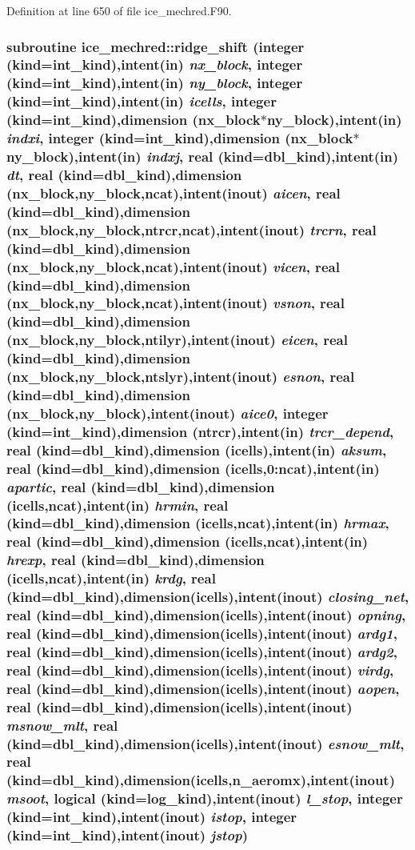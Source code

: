 Definition at line 650 of file ice\_\-mechred.F90.\hypertarget{namespaceice__mechred_ad5b2abaa36fa52ab9a96420dbf8d48cc}{
\subsubsection[{ridge\_\-shift}]{\setlength{\rightskip}{0pt plus 5cm}subroutine ice\_\-mechred::ridge\_\-shift (integer (kind=int\_\-kind),intent(in) {\em nx\_\-block}, \/  integer (kind=int\_\-kind),intent(in) {\em ny\_\-block}, \/  integer (kind=int\_\-kind),intent(in) {\em icells}, \/  integer (kind=int\_\-kind),dimension (nx\_\-block$\ast$ny\_\-block),intent(in) {\em indxi}, \/  integer (kind=int\_\-kind),dimension (nx\_\-block$\ast$ny\_\-block),intent(in) {\em indxj}, \/  real (kind=dbl\_\-kind),intent(in) {\em dt}, \/  real (kind=dbl\_\-kind),dimension (nx\_\-block,ny\_\-block,ncat),intent(inout) {\em aicen}, \/  real (kind=dbl\_\-kind),dimension (nx\_\-block,ny\_\-block,ntrcr,ncat),intent(inout) {\em trcrn}, \/  real (kind=dbl\_\-kind),dimension (nx\_\-block,ny\_\-block,ncat),intent(inout) {\em vicen}, \/  real (kind=dbl\_\-kind),dimension (nx\_\-block,ny\_\-block,ncat),intent(inout) {\em vsnon}, \/  real (kind=dbl\_\-kind),dimension (nx\_\-block,ny\_\-block,ntilyr),intent(inout) {\em eicen}, \/  real (kind=dbl\_\-kind),dimension (nx\_\-block,ny\_\-block,ntslyr),intent(inout) {\em esnon}, \/  real (kind=dbl\_\-kind),dimension (nx\_\-block,ny\_\-block),intent(inout) {\em aice0}, \/  integer (kind=int\_\-kind),dimension (ntrcr),intent(in) {\em trcr\_\-depend}, \/  real (kind=dbl\_\-kind),dimension (icells),intent(in) {\em aksum}, \/  real (kind=dbl\_\-kind),dimension (icells,0:ncat),intent(in) {\em apartic}, \/  real (kind=dbl\_\-kind),dimension (icells,ncat),intent(in) {\em hrmin}, \/  real (kind=dbl\_\-kind),dimension (icells,ncat),intent(in) {\em hrmax}, \/  real (kind=dbl\_\-kind),dimension (icells,ncat),intent(in) {\em hrexp}, \/  real (kind=dbl\_\-kind),dimension (icells,ncat),intent(in) {\em krdg}, \/  real (kind=dbl\_\-kind),dimension(icells),intent(inout) {\em closing\_\-net}, \/  real (kind=dbl\_\-kind),dimension(icells),intent(inout) {\em opning}, \/  real (kind=dbl\_\-kind),dimension(icells),intent(inout) {\em ardg1}, \/  real (kind=dbl\_\-kind),dimension(icells),intent(inout) {\em ardg2}, \/  real (kind=dbl\_\-kind),dimension(icells),intent(inout) {\em virdg}, \/  real (kind=dbl\_\-kind),dimension(icells),intent(inout) {\em aopen}, \/  real (kind=dbl\_\-kind),dimension(icells),intent(inout) {\em msnow\_\-mlt}, \/  real (kind=dbl\_\-kind),dimension(icells),intent(inout) {\em esnow\_\-mlt}, \/  real (kind=dbl\_\-kind),dimension(icells,n\_\-aeromx),intent(inout) {\em msoot}, \/  logical (kind=log\_\-kind),intent(inout) {\em l\_\-stop}, \/  integer (kind=int\_\-kind),intent(inout) {\em istop}, \/  integer (kind=int\_\-kind),intent(inout) {\em jstop})}}
\label{namespaceice__mechred_ad5b2abaa36fa52ab9a96420dbf8d48cc}


